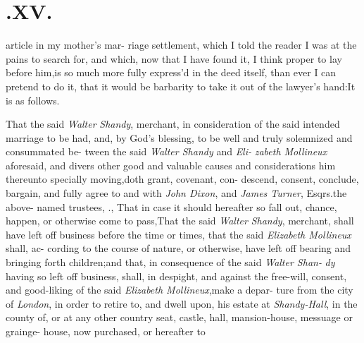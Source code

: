 \documentclass{article}
\begin{document}
\null
\section{.\enspace XV.}

 article in my mother’s mar-\break 
riage settlement, which I told the\break
reader I was at the pains to search for, and which, now that I have
found it, I think proper to lay before him,\tsk  is so much more fully
express’d in the deed itself, than ever I can pretend to do it, that it
would be barbarity to take it out of the lawyer’s hand:\tsk  It is as
follows.

\indent\lqq{}\break
\lqq {}\quad That the said \textit{Walter}\break
\lqq \textit{Shandy}, merchant, in consideration of\break
\lqq the said intended marriage to be had,\break
\lqq and, by God’s blessing, to be well and 
\lqq truly solemnized and consummated be-\break
\lqq tween the said \textit{Walter Shandy} and \textit{Eli-}\break
\lqq \textit{zabeth Mollineux} aforesaid, and divers\break
\lqq other good and valuable causes and\break
\lqq considerations him thereunto specially\break
\lqq moving,\tsk  doth grant, covenant, con-\break
\lqq descend, consent, conclude, bargain,\break
\lqq and fully agree to and with \textit{John Dixon},\break
\lqq and \textit{James Turner}, Esqrs.\@ the above-\break
\lqq named trustees, \etc \etc.\tsk{},\tsk\break
\lqq That in case it should hereafter so fall\break
\lqq out, chance, happen, or otherwise\break
\lqq come to pass,\tsk  That the said \textit{Walter}\break
\lqq \textit{Shandy}, merchant, shall have left off\break
\lqq business before the time or times, that\break
\lqq the said \textit{Elizabeth Mollineux} shall, ac-\break
\lqq cording to the course of nature, or\break
\lqq otherwise, have left off bearing and\break
\lqq bringing forth children;\tsk  and that,\break
\lqq in consequence of the said \textit{Walter Shan-}\break
\lqq \textit{dy} having so left off business, shall, 
\lqq in despight, and against the free-will,\break
\lqq consent, and good-liking of the said\break
\lqq \textit{Elizabeth Mollineux},\tsk  make a depar-\break
\lqq ture from the city of \textit{London}, in order\break
\lqq to retire to, and dwell upon, his estate\break
\lqq at \textit{Shandy-Hall}, in the county of\tsh,\break
\lqq or at any other country seat, castle, hall,\break
\lqq mansion-house, messuage or grainge-\break
\lqq house, now purchased, or hereafter to\break
\end{document}
